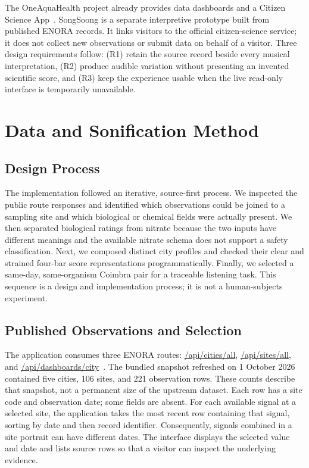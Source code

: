 \documentclass[conference]{IEEEtran}
\begin{document}
The OneAquaHealth project already provides data dashboards and a Citizen Science App~\cite{oah-solutions}. SongSoong is a separate interpretive prototype built from published ENORA records. It links visitors to the official citizen-science service; it does not collect new observations or submit data on behalf of a visitor. Three design requirements follow: (R1) retain the source record beside every musical interpretation, (R2) produce audible variation without presenting an invented scientific score, and (R3) keep the experience usable when the live read-only interface is temporarily unavailable.

\section{Data and Sonification Method}
\subsection{Design Process}
The implementation followed an iterative, source-first process. We inspected the public route responses and identified which observations could be joined to a sampling site and which biological or chemical fields were actually present. We then separated biological ratings from nitrate because the two inputs have different meanings and the available nitrate schema does not support a safety classification. Next, we composed distinct city profiles and checked their clear and strained four-bar score representations programmatically. Finally, we selected a same-day, same-organism Coimbra pair for a traceable listening task. This sequence is a design and implementation process; it is not a human-subjects experiment.

\subsection{Published Observations and Selection}
The application consumes three ENORA routes: \url{/api/cities/all}, \url{/api/sites/all}, and \url{/api/dashboards/city}~\cite{enora-api}. The bundled snapshot refreshed on 1 October 2026 contained five cities, 106 sites, and 221 observation rows. These counts describe that snapshot, not a permanent size of the upstream dataset. Each row has a site code and observation date; some fields are absent. For each available signal at a selected site, the application takes the most recent row containing that signal, sorting by date and then record identifier. Consequently, signals combined in a site portrait can have different dates. The interface displays the selected value and date and lists source rows so that a visitor can inspect the underlying evidence.
\end{document}
